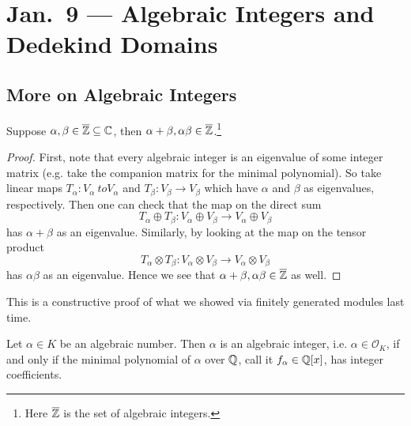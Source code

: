 \chapter{Jan.~9 --- Algebraic Integers and Dedekind Domains}

\section{More on Algebraic Integers}
\begin{prop}
  Suppose $\alpha, \beta \in \overline{\mathbb{Z}} \subseteq \mathbb{C}$,
  then
  $\alpha + \beta, \alpha \beta \in \overline{\mathbb{Z}}$.\footnote{Here $\overline{\mathbb{Z}}$ is the set of algebraic integers.}
\end{prop}

\begin{proof}
  First, note that every algebraic integer is an
  eigenvalue of some integer matrix (e.g. take the
  companion matrix for the minimal polynomial).
  So take linear maps $T_\alpha : V_\alpha \ to V_\alpha$
  and $T_\beta : V_\beta \to V_\beta$ which have
  $\alpha$ and $\beta$ as eigenvalues, respectively.
  Then one can check that the map on the direct sum
  \[
    T_\alpha \oplus T_\beta : V_\alpha \oplus V_\beta \to V_\alpha \oplus V_\beta
  \]
  has $\alpha + \beta$ as an eigenvalue. Similarly,
  by looking at the map on the tensor product
  \[
    T_\alpha \otimes T_\beta : V_\alpha \otimes V_\beta \to V_\alpha \otimes V_\beta
  \]
  has $\alpha \beta$ as an eigenvalue. Hence we see
  that
  $\alpha + \beta, \alpha \beta \in \overline{\mathbb{Z}}$ as
  well.
\end{proof}

\begin{remark}
  This is a constructive proof of what we showed via
  finitely generated modules last time.
\end{remark}

\begin{lemma}
  Let $\alpha \in K$ be an algebraic number. Then
  $\alpha$ is an algebraic integer, i.e.
  $\alpha \in \mathcal{O}_K$, if and only if the
  minimal polynomial of $\alpha$ over $\mathbb{Q}$, call it
  $f_\alpha \in \mathbb{Q}[x]$, has integer coefficients.
\end{lemma}

